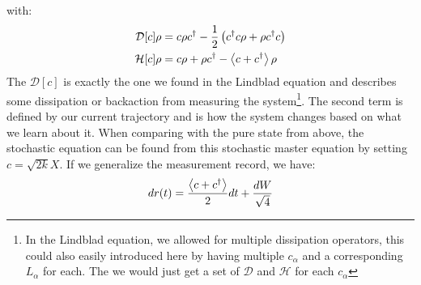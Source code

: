 with:
\begin{align}
    \mathcal{D}[c] \rho &= c\rho c^\dagger - \frac12 \left(c^\dagger c \rho + \rho c^\dagger c\right) \\ 
    \mathcal{H}[c] \rho &= c\rho + \rho c^\dagger - \expval{c + c^\dagger}\rho
\end{align}
The $\mathcal{D}[c]$ is exactly the one we found in the Lindblad equation and describes some dissipation or backaction from measuring the system\footnote{In the Lindblad equation, we allowed for multiple dissipation operators, this could also easily introduced here by having multiple $c_\alpha$ and a corresponding $L_\alpha$ for each. The we would just get a set of $\mathcal{D}$ and $\mathcal{H}$ for each $c_\alpha$}. The second term is defined by our current trajectory and is how the system changes based on what we learn about it. When comparing with the pure state from above, the stochastic equation can be found from this stochastic master equation by setting $c = \sqrt{2k}X$. If we generalize the measurement record, we have\cite{jacobs_straightforward_2006}:
\begin{equation}
    dr(t) = \frac{\expval{c + c^\dagger}}{2}dt + \frac{dW}{\sqrt{4}}
\end{equation}


